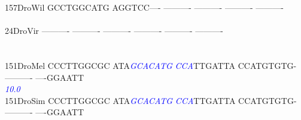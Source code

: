 \documentclass[11pt,twoside,reqno,a4paper]{article}
\begin{document}
{157\hspace*{1\charwidth}DroWil	GCCTGGCATG	AGGTCC----	----------	----------	----------	----------	\\
\hspace*{4\charwidth}\hspace*{7\charwidth}\hspace*{1\charwidth}\hspace*{1\charwidth}\hspace*{1\charwidth}\hspace*{1\charwidth}\hspace*{1\charwidth}\hspace*{1\charwidth}\\
24\hspace*{2\charwidth}DroVir	----------	----------	----------	----------	----------	----------	\\
\hspace*{4\charwidth}\hspace*{7\charwidth}\hspace*{1\charwidth}\hspace*{1\charwidth}\hspace*{1\charwidth}\hspace*{1\charwidth}\hspace*{1\charwidth}\hspace*{1\charwidth}\\
\\
151\hspace*{1\charwidth}DroMel	CCCTTGGCGC	ATA\textit{\textcolor{Blue}{G}}\textit{\textcolor{Blue}{C}}\textit{\textcolor{Blue}{A}}\textit{\textcolor{Blue}{C}}\textit{\textcolor{Blue}{A}}\textit{\textcolor{Blue}{T}}\textit{\textcolor{Blue}{G}}	\textit{\textcolor{Blue}{C}}\textit{\textcolor{Blue}{C}}\textit{\textcolor{Blue}{A}}TTGATTA	CCATGTGTG-	----------	----GGAATT	\\
\hspace*{4\charwidth}\hspace*{7\charwidth}\hspace*{1\charwidth}\hspace*{13\charwidth}\textit{\textcolor{Blue}{10.0}}\hspace*{1\charwidth}\hspace*{1\charwidth}\hspace*{1\charwidth}\hspace*{1\charwidth}\hspace*{1\charwidth}\\
151\hspace*{1\charwidth}DroSim	CCCTTGGCGC	ATA\textit{\textcolor{Blue}{G}}\textit{\textcolor{Blue}{C}}\textit{\textcolor{Blue}{A}}\textit{\textcolor{Blue}{C}}\textit{\textcolor{Blue}{A}}\textit{\textcolor{Blue}{T}}\textit{\textcolor{Blue}{G}}	\textit{\textcolor{Blue}{C}}\textit{\textcolor{Blue}{C}}\textit{\textcolor{Blue}{A}}TTGATTA	CCATGTGTG-	----------	----GGAATT	\\
}
\end{document}
